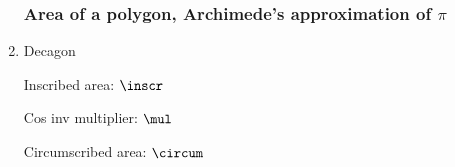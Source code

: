 \begin{enumerate}[itemsep=0.25cm]
\subsubsection*{Area of a polygon, Archimede's approximation of $\pi$}
\item Decagon \par
{} 
Inscribed area: $\inscr$ \par 

Cos inv multiplier: $\mul$

\FPeval{\circum}{\inscr * \mul * \mul} 
Circumscribed area: $\circum$


\end{enumerate}
